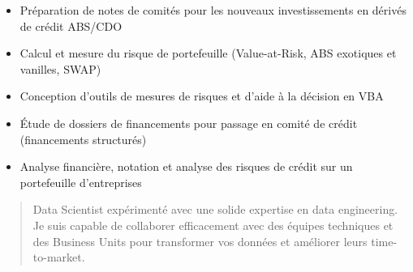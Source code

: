 \documentclass[10pt,a4paper,ragged2e,withhyper]{altacv}
\begin{document}
\begin{paracol}{2}
\divider

\begin{itemize}
\item Préparation de notes de comités pour les nouveaux investissements en dérivés de crédit ABS/CDO
\item Calcul et mesure du risque de portefeuille (Value-at-Risk, ABS exotiques et vanilles, SWAP)
\item Conception d'outils de mesures de risques et d'aide à la décision en VBA
\end{itemize}

\divider

\begin{itemize}
\item Étude de dossiers de financements pour passage en comité de crédit (financements structurés)
\item Analyse financière, notation et analyse des risques de crédit sur un portefeuille d'entreprises
\end{itemize}



\switchcolumn


\begin{quote}
Data Scientist expérimenté avec une solide expertise en data engineering. Je suis capable de collaborer efficacement avec des équipes techniques et des Business Units pour transformer vos données et améliorer leurs time-to-market.
\end{quote}

{\LaTeXraggedright
{}
\par}

{\LaTeXraggedright
{}
\par}


\end{paracol}
\end{document}
